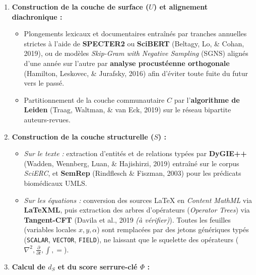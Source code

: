 \documentclass[a4paper,11pt]{article}
\providecommand{\tightlist}{\setlength{\itemsep}{0pt}\setlength{\parskip}{0pt}}
\begin{document}
\begin{enumerate}
\def\labelenumi{\arabic{enumi}.}
\tightlist
\item
  \textbf{Construction de la couche de surface (\(U\)) et alignement
  diachronique :}

  \begin{itemize}
  \tightlist
  \item
    Plongements lexicaux et documentaires entraînés par tranches
    annuelles strictes à l'aide de \textbf{SPECTER2} ou \textbf{SciBERT}
    (Beltagy, Lo, \& Cohan, 2019), ou de modèles \emph{Skip-Gram with
    Negative Sampling} (SGNS) alignés d'une année sur l'autre par
    \textbf{analyse procustéenne orthogonale} (Hamilton, Leskovec, \&
    Jurafsky, 2016) afin d'éviter toute fuite du futur vers le passé.
  \item
    Partitionnement de la couche communautaire \(C\) par
    l'\textbf{algorithme de Leiden} (Traag, Waltman, \& van Eck, 2019)
    sur le réseau bipartite auteurs-revues.
  \end{itemize}
\item
  \textbf{Construction de la couche structurelle (\(S\)) :}

  \begin{itemize}
  \tightlist
  \item
    \emph{Sur le texte :} extraction d'entités et de relations typées
    par \textbf{DyGIE++} (Wadden, Wennberg, Luan, \& Hajishirzi, 2019)
    entraîné sur le corpus \emph{SciERC}, et \textbf{SemRep} (Rindflesch
    \& Fiszman, 2003) pour les prédicats biomédicaux UMLS.
  \item
    \emph{Sur les équations :} conversion des sources LaTeX en
    \emph{Content MathML} via \textbf{LaTeXML}, puis extraction des
    arbres d'opérateurs (\emph{Operator Trees}) via \textbf{Tangent-CFT}
    (Davila et al., 2019 \emph{(à vérifier)}). Toutes les feuilles
    (variables locales \(x, y, \alpha\)) sont remplacées par des jetons
    génériques typés (\texttt{SCALAR}, \texttt{VECTOR}, \texttt{FIELD}),
    ne laissant que le squelette des opérateurs
    (\(\nabla^2, \frac{\partial}{\partial t}, \int, =\)).
  \end{itemize}
\item
  \textbf{Calcul de \(d_S\) et du score serrure-clé \(\Phi\) :}


\end{enumerate}
\end{document}
